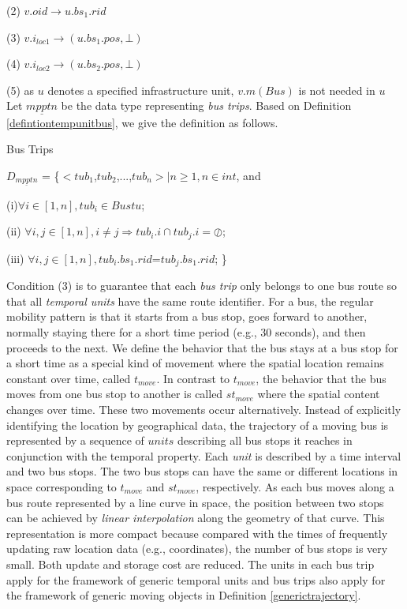 (2) $v.oid \rightarrow u.bs_1.rid$

(3) $v.i_{loc1} \rightarrow (u.bs_1.pos,\bot)$

(4) $v.i_{loc2} \rightarrow (u.bs_2.pos,\bot)$ 

(5) as $u$ denotes a specified infrastructure unit, $v.m(Bus)$ is not needed in $u$\\


Let $\underline{mpptn}$ be the data type representing \textit{bus trips}. Based on Definition \ref{defintiontempunitbus}, we give the definition as follows.

\begin{Statement}
\label{defintionmovingbus}
Bus Trips  

$D_{\underline{mpptn}}$ = \{$<tub_1$,$tub_2$,...,$tub_n>|n \geq 1,n \in int$, and

(i)$\forall i \in [1,n], tub_i \in Bustu$; 

(ii) $\forall i,j \in[1,n], i \neq j \Rightarrow tub_i.i \cap tub_j.i=\oslash$; 

(iii) $\forall i,j \in [1,n], tub_i.bs_1.rid$=$tub_j.bs_1.rid$; \}

\end{Statement}

Condition (3) is to guarantee that each \textit{bus trip} only
belongs to one bus route so that all \textit{temporal units} have the same route identifier.
For a bus, the regular mobility pattern is that it starts from a bus stop,
goes forward to another, normally staying there for a short time period (e.g., 30 seconds), 
and then proceeds to the next. We define the behavior that the bus stays at a bus stop for a short time 
as a special kind of movement where the spatial location remains constant over time, called $t_{move}$. In contrast to $t_{move}$, the behavior that the bus moves  
from one bus stop to another is called $st_{move}$ where the spatial content changes 
over time. These two movements occur alternatively. 
Instead of explicitly identifying the location by geographical data, the trajectory of a 
moving bus is represented by a sequence of $units$ describing all bus stops it reaches  
in conjunction with the temporal property. Each \textit{unit} is described by a time interval
and two bus stops. The two bus stops can have the 
same or different locations in space corresponding to $t_{move}$ and $st_{move}$, 
respectively. As each bus moves along a bus route represented by a line curve in space,
the position between two stops can be achieved by \textit{linear interpolation} along the geometry of that curve. This representation is more compact because compared with the times of frequently 
updating raw  location data (e.g., coordinates), the number of bus stops is very small. Both update and storage cost are reduced. The units in each bus trip apply for the framework of generic temporal units and bus trips also apply for the framework of generic moving objects in Definition \ref{generictrajectory}. \\


